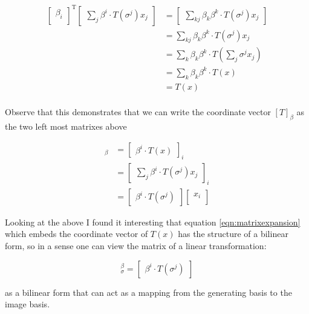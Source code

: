 \documentclass{article}      %
\begin{document}
\begin{align*}
{
\begin{bmatrix}
\beta_i \\
\end{bmatrix}
}^{\text{T}}
\begin{bmatrix}
\sum_j \beta^i \cdot T(\sigma^j) x_j
\end{bmatrix} 
&=
\begin{bmatrix}
\sum_{kj} \beta_k \beta^k \cdot T(\sigma^j) x_j
\end{bmatrix} \\
&=
\sum_{kj} \beta_k \beta^k \cdot T(\sigma^j) x_j \\
&=
\sum_{k} \beta_k \beta^k \cdot T(\sum_j \sigma^j x_j) \\
&=
\sum_{k} \beta_k \beta^k \cdot T(x) \\
&=
T(x) \\
\end{align*}

Observe that this demonstrates that we can write the coordinate vector $[T]_\beta$ as the two left most matrixes above

\begin{align*}
[T(x)]_\beta 
&= 
{
\begin{bmatrix}
\beta^i \cdot T(x)
\end{bmatrix}
}_i \\
&= 
{
\begin{bmatrix}
\sum_{j} \beta^i \cdot T(\sigma^j) x_j
\end{bmatrix}
}_i \\
&=
\begin{bmatrix}
\beta^i \cdot T(\sigma^j)
\end{bmatrix}
\begin{bmatrix}
x_i \\
\end{bmatrix}
\end{align*}

Looking at the above I found it interesting that equation \ref{eqn:matrixexpansion} which embeds the coordinate vector of $T(x)$ has the structure of a bilinear form, so in a sense one can view the
matrix of a linear transformation:

\begin{equation}
[T]_\sigma^\beta = 
\begin{bmatrix}
\beta^i \cdot T(\sigma^j)
\end{bmatrix}
\end{equation}

as a bilinear form that can act as a mapping from the generating basis to the image basis.
\end{document}
